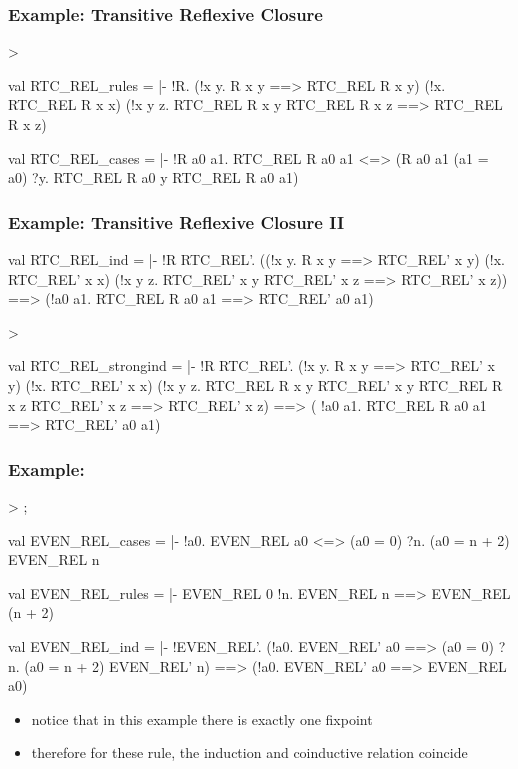 \begin{frame}[fragile]
\frametitle{Example: Transitive Reflexive Closure}
\begin{semiverbatim}\scriptsize
> 

val RTC_REL_rules = |- !R.
  (!x y. R x y ==> RTC_REL R x y) \holAnd{} (!x. RTC_REL R x x) \holAnd{}
  (!x y z. RTC_REL R x y \holAnd{} RTC_REL R x z ==> RTC_REL R x z)

val RTC_REL_cases = |- !R a0 a1.
  RTC_REL R a0 a1 <=>
  (R a0 a1 \holOr{} (a1 = a0) \holOr{} ?y. RTC_REL R a0 y \holAnd{} RTC_REL R a0 a1)
\end{semiverbatim}
\end{frame}


\begin{frame}[fragile]
\frametitle{Example: Transitive Reflexive Closure II}
\begin{semiverbatim}\scriptsize
val RTC_REL_ind = |- !R RTC_REL'.
  ((!x y. R x y ==> RTC_REL' x y) \holAnd{} (!x. RTC_REL' x x) \holAnd{}
   (!x y z. RTC_REL' x y \holAnd{} RTC_REL' x z ==> RTC_REL' x z)) ==>
  (!a0 a1. RTC_REL R a0 a1 ==> RTC_REL' a0 a1)


> 

val RTC_REL_strongind = |- !R RTC_REL'.
  (!x y. R x y ==> RTC_REL' x y) \holAnd{} (!x. RTC_REL' x x) \holAnd{}
  (!x y z.
      RTC_REL R x y \holAnd{} RTC_REL' x y \holAnd{} RTC_REL R x z \holAnd{}
      RTC_REL' x z ==>
      RTC_REL' x z) ==>
  ( !a0 a1. RTC_REL R a0 a1 ==> RTC_REL' a0 a1)
\end{semiverbatim}
\end{frame}


\begin{frame}[fragile]
\frametitle{Example: }
\begin{semiverbatim}\scriptsize
> ;

val EVEN_REL_cases =
 |- !a0. EVEN_REL a0 <=> (a0 = 0) \holOr{} ?n. (a0 = n + 2) \holAnd{} EVEN_REL n

val EVEN_REL_rules =
 |- EVEN_REL 0 \holAnd{} !n. EVEN_REL n ==> EVEN_REL (n + 2)

val EVEN_REL_ind = |- !EVEN_REL'.
   (!a0.
      EVEN_REL' a0 ==>
      (a0 = 0) \holOr{} ?n. (a0 = n + 2) \holAnd{} EVEN_REL' n) ==>
   (!a0. EVEN_REL' a0 ==> EVEN_REL a0)
\end{semiverbatim}
\begin{itemize}
\item notice that in this example there is exactly one fixpoint
\item therefore for these rule, the induction and coinductive relation coincide
\end{itemize}
\end{frame}


